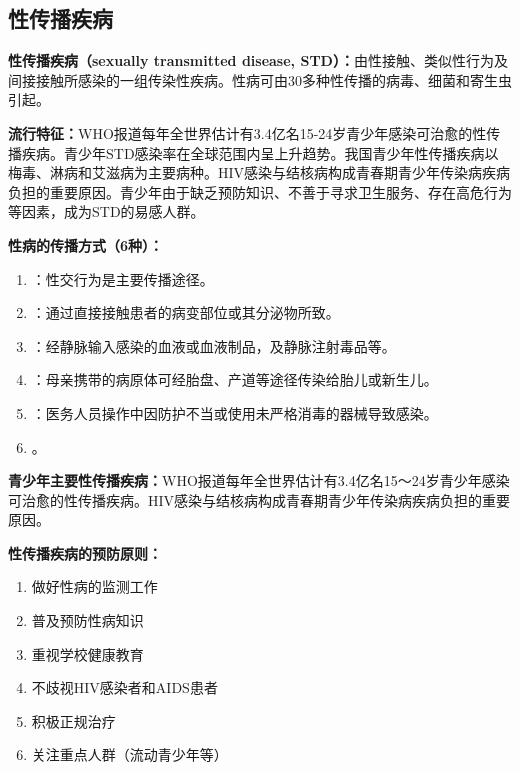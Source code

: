 \subsection{性传播疾病}

\begin{defbox}
\textbf{性传播疾病（sexually transmitted disease, STD）：}由性接触、类似性行为及间接接触所感染的一组传染性疾病。性病可由30多种性传播的病毒、细菌和寄生虫引起。
\end{defbox}

\begin{keybox}
\textbf{流行特征：}WHO报道每年全世界估计有3.4亿名15-24岁青少年感染可治愈的性传播疾病。青少年STD感染率在全球范围内呈上升趋势。我国青少年性传播疾病以梅毒、淋病和艾滋病为主要病种。HIV感染与结核病构成青春期青少年传染病疾病负担的重要原因。青少年由于缺乏预防知识、不善于寻求卫生服务、存在高危行为等因素，成为STD的易感人群。

\textbf{性病的传播方式（6种）：}
\begin{enumerate}[leftmargin=*]
    \item {}：性交行为是主要传播途径。
    \item {}：通过直接接触患者的病变部位或其分泌物所致。
    \item {}：经静脉输入感染的血液或血液制品，及静脉注射毒品等。
    \item {}：母亲携带的病原体可经胎盘、产道等途径传染给胎儿或新生儿。
    \item {}：医务人员操作中因防护不当或使用未严格消毒的器械导致感染。
    \item {}。
\end{enumerate}

\textbf{青少年主要性传播疾病：}WHO报道每年全世界估计有3.4亿名15～24岁青少年感染可治愈的性传播疾病。HIV感染与结核病构成青春期青少年传染病疾病负担的重要原因。

\textbf{性传播疾病的预防原则：}
\begin{enumerate}[leftmargin=*]
    \item 做好性病的监测工作
    \item 普及预防性病知识
    \item 重视学校健康教育
    \item 不歧视HIV感染者和AIDS患者
    \item 积极正规治疗
    \item 关注重点人群（流动青少年等）
\end{enumerate}
\end{keybox}

